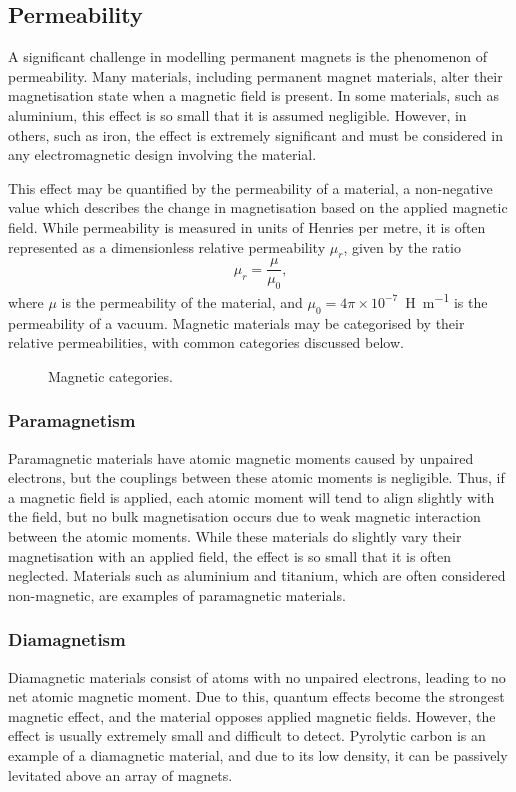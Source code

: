 \subsection{Permeability}
A significant challenge in modelling permanent magnets is the phenomenon of permeability. Many materials, including permanent magnet materials, alter their magnetisation state when a magnetic field is present. In some materials, such as aluminium, this effect is so small that it is assumed negligible. However, in others, such as iron, the effect is extremely significant and must be considered in any electromagnetic design involving the material.

This effect may be quantified by the permeability of a material, a non-negative value which describes the change in magnetisation based on the applied magnetic field. While permeability is measured in units of Henries per metre, it is often represented as a dimensionless relative permeability \(\mu_r\), given by the ratio
\begin{equation}
    \mu_r = \frac{\mu}{\mu_0} \text{,}
\end{equation}
where \(\mu\) is the permeability of the material, and \(\mu_0 = 4\pi \times 10^{-7}\)~\si{\henry\per\metre} is the permeability of a vacuum. Magnetic materials may be categorised by their relative permeabilities, with common categories discussed below.
\begin{figure}
    \centering
    \vspace{5cm}
    \caption{Magnetic categories.}
    \label{fig:magneticCategories}
\end{figure}

\subsubsection*{Paramagnetism}
Paramagnetic materials have atomic magnetic moments caused by unpaired electrons, but the couplings between these atomic moments is negligible. Thus, if a magnetic field is applied, each atomic moment will tend to align slightly with the field, but no bulk magnetisation occurs due to weak magnetic interaction between the atomic moments. While these materials do slightly vary their magnetisation with an applied field, the effect is so small that it is often neglected. Materials such as aluminium and titanium, which are often considered non-magnetic, are examples of paramagnetic materials.

\subsubsection*{Diamagnetism}
Diamagnetic materials consist of atoms with no unpaired electrons, leading to no net atomic magnetic moment. Due to this, quantum effects become the strongest magnetic effect, and the material opposes applied magnetic fields. However, the effect is usually extremely small and difficult to detect. Pyrolytic carbon is an example of a diamagnetic material, and due to its low density, it can be passively levitated above an array of magnets.

